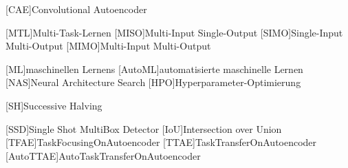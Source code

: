 \begin{acronym}[IEEE]
	
	[CAE]{Convolutional Autoencoder}	
	
	[MTL]{Multi-Task-Lernen}		
	[MISO]{Multi-Input Single-Output}	
	[SIMO]{Single-Input Multi-Output}	
	[MIMO]{Multi-Input Multi-Output}	
	
	[ML]{maschinellen Lernens}
	[AutoML]{automatisierte maschinelle Lernen}
	[NAS]{Neural Architecture Search}
	[HPO]{Hyperparameter-Optimierung}
	
	[SH]{Successive Halving}	
	
	
	[SSD]{Single Shot MultiBox Detector}
	[IoU]{Intersection over Union}
	[TFAE]{TaskFocusingOnAutoencoder}
	[TTAE]{TaskTransferOnAutoencoder}
	[AutoTTAE]{AutoTaskTransferOnAutoencoder}
			
\end{acronym}
